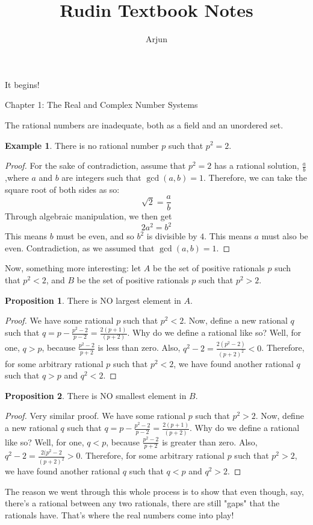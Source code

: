 \documentclass{article}
\title{Rudin Textbook Notes}
\author{Arjun}
\theoremstyle{definition}
\newtheorem{exmp}{Example}[section]
\newtheorem{prop}{Proposition}[section]
\begin{document}
\maketitle
\begin{center}
 It begins!
 \end{center}
 \newpage
\begin{center}
 Chapter 1: The Real and Complex Number Systems
 \end{center}
 
 \begin{section}
 \noindent The rational numbers are inadequate, both as a field and an unordered set.
 \begin{exmp}
There is no rational number $p$ such that $p^2 = 2$.
\end{exmp}


\begin{proof}
For the sake of contradiction, assume that $p^2 = 2$ has a rational solution, $\frac{a}{b}$ ,where $a$ and $b$ are integers such that $\gcd (a,b) = 1$. Therefore, we can take the square root of both sides as so: 
\[ \sqrt{2} = \frac{a}{b} \]
Through algebraic manipulation, we then get 
\[ 2a^2 = b^2 \]
This means $b$ must be even, and so $b^2$ is divisible by $4$. This means $a$ must also be even. Contradiction, as we assumed that $\gcd (a,b) = 1$.
\end{proof}

\noindent Now, something more interesting: let $A$ be the set of positive rationals $p$ such that $p^2 < 2$, and $B$ be the set of positive rationals $p$ such that $p^2 > 2$.

\begin{prop}
There is NO largest element in $A$.
\end{prop}
\begin{proof}
We have some rational $p$ such that $p^2 < 2$. Now, define a new rational $q$ such that $q = p - \frac{p^2-2}{p-2} = \frac{2(p+1)}{(p+2)}$. Why do we define a rational like so? Well, for one, $q > p$, because $\frac{p^2-2}{p+2}$ is less than zero. Also, $q^2 - 2 = \frac{2(p^2-2)}{(p+2)^2} < 0$. Therefore, for some arbitrary rational $p$ such that $p^2 < 2$, we have found another rational $q$ such that $q > p$ and $q^2 < 2$.
\end{proof}

\begin{prop}
There is NO smallest element in $B$.
\end{prop}
\begin{proof}
Very similar proof. We have some rational $p$ such that $p^2 > 2$. Now, define a new rational $q$ such that $q = p - \frac{p^2-2}{p-2} = \frac{2(p+1)}{(p+2)}$. Why do we define a rational like so? Well, for one, $q < p$, because $\frac{p^2-2}{p+2}$ is greater than zero. Also, $q^2 - 2 = \frac{2(p^2-2}{(p+2)^2} > 0$. Therefore, for some arbitrary rational $p$ such that $p^2 > 2$, we have found another rational $q$ such that $q < p$ and $q^2 > 2$.
\end{proof}

\noindent The reason we went through this whole process is to show that even though, say, there's a rational between any two rationals, there are still "gaps" that the rationals have. That's where the real numbers come into play!



\end{section}

 
 
 
\end{document}
